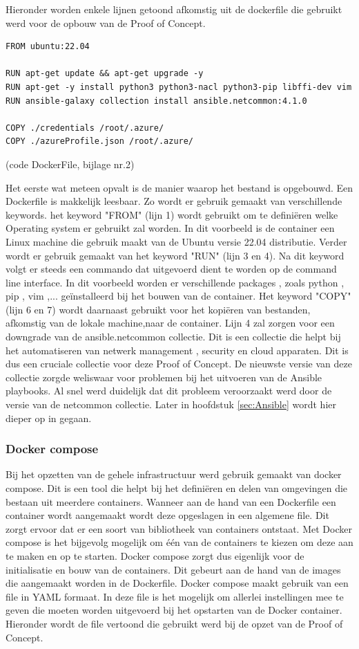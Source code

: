 Hieronder worden enkele lijnen getoond afkomstig uit de dockerfile die gebruikt werd voor de opbouw van de Proof of Concept. 


\begin{lstlisting}
FROM ubuntu:22.04

RUN apt-get update && apt-get upgrade -y
RUN apt-get -y install python3 python3-nacl python3-pip libffi-dev vim
RUN ansible-galaxy collection install ansible.netcommon:4.1.0 

COPY ./credentials /root/.azure/
COPY ./azureProfile.json /root/.azure/
\end{lstlisting}
(code DockerFile, bijlage nr.2)

Het eerste wat meteen opvalt is de manier waarop het bestand is opgebouwd. Een Dockerfile is makkelijk leesbaar. Zo wordt er gebruik gemaakt van verschillende keywords. het keyword "FROM" (lijn 1) wordt gebruikt om te definiëren welke Operating system er gebruikt zal worden. In dit voorbeeld is de container een Linux machine die gebruik maakt van de Ubuntu versie 22.04 distributie. Verder wordt er gebruik gemaakt van het keyword "RUN" (lijn 3 en 4). Na dit keyword volgt er steeds een commando dat uitgevoerd dient te worden op de command line interface. In dit voorbeeld worden er verschillende packages , zoals python , pip , vim ,... geïnstalleerd bij het bouwen van de container. Het keyword "COPY" (lijn 6 en 7) wordt daarnaast gebruikt voor het kopiëren van bestanden, afkomstig van de lokale machine,naar de container. Lijn 4 zal zorgen voor een downgrade van de ansible.netcommon collectie. Dit is een collectie die helpt bij het automatiseren van netwerk management , security en cloud apparaten. Dit is dus een cruciale collectie voor deze Proof of Concept. De nieuwste versie van deze collectie zorgde weliswaar voor problemen bij het uitvoeren van de Ansible playbooks. Al snel werd duidelijk dat dit probleem veroorzaakt werd door de versie van de netcommon collectie. Later in hoofdstuk \ref{sec:Ansible} wordt hier dieper op in gegaan. 

\subsubsection{Docker compose}
Bij het opzetten van de gehele infrastructuur werd gebruik gemaakt van docker compose. Dit is een tool die helpt bij het definiëren en delen van omgevingen die bestaan uit meerdere containers. Wanneer aan de hand van een Dockerfile een container wordt aangemaakt wordt deze opgeslagen in een algemene file. Dit zorgt ervoor dat er een soort van bibliotheek van containers ontstaat. Met Docker compose is het bijgevolg mogelijk om één van de containers te kiezen om deze aan te maken en op te starten. Docker compose zorgt dus eigenlijk voor de initialisatie en bouw van de containers. Dit gebeurt aan de hand van de images die aangemaakt worden in de Dockerfile. Docker compose maakt gebruik van een file in YAML formaat. In deze file is het mogelijk om allerlei instellingen mee te geven die moeten worden uitgevoerd bij het opstarten van de Docker container. Hieronder wordt de file vertoond die gebruikt werd bij de opzet van de Proof of Concept. \newline

